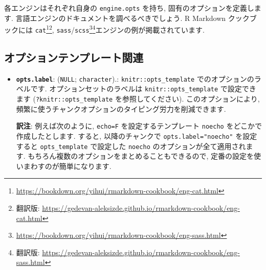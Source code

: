 \documentclass[
  11pt,
  lualatex,ja=standard,jafont=noto]{bxjsreport}
\newenvironment{Shaded}{\begin{snugshade}}{\end{snugshade}}
\newcommand{\AttributeTok}[1]{\textcolor[rgb]{0.77,0.63,0.00}{#1}}
\newcommand{\FunctionTok}[1]{\textcolor[rgb]{0.00,0.00,0.00}{#1}}
\newcommand{\NormalTok}[1]{#1}
\newcommand{\SpecialCharTok}[1]{\textcolor[rgb]{0.00,0.00,0.00}{#1}}
\newcommand{\StringTok}[1]{\textcolor[rgb]{0.31,0.60,0.02}{#1}}
\renewcommand{\href}[2]{#2\footnote{\url{#1}}}
\begin{document}
\begin{itemize}
\begin{Shaded}
\end{Shaded}

  各エンジンはそれぞれ自身の \texttt{engine.opts} を持ち, 固有のオプションを定義します. 言語エンジンのドキュメントを調べるべきでしょう. R Markdown クックブックには \href{https://bookdown.org/yihui/rmarkdown-cookbook/eng-cat.html}{\texttt{cat}}\footnote{翻訳版: \url{https://gedevan-aleksizde.github.io/rmarkdown-cookbook/eng-cat.html}}, \href{https://bookdown.org/yihui/rmarkdown-cookbook/eng-sass.html}{\texttt{sass}/\texttt{scss}}\footnote{翻訳版: \url{https://gedevan-aleksizde.github.io/rmarkdown-cookbook/eng-sass.html}}エンジンの例が掲載されています.
\end{itemize}

\hypertarget{ux30aaux30d7ux30b7ux30e7ux30f3ux30c6ux30f3ux30d7ux30ecux30fcux30c8ux95a2ux9023}{%
\subsection{オプションテンプレート関連}\label{ux30aaux30d7ux30b7ux30e7ux30f3ux30c6ux30f3ux30d7ux30ecux30fcux30c8ux95a2ux9023}}

\begin{itemize}
\item
  \textbf{\texttt{opts.label}}: (\texttt{NULL}; \texttt{character}).: \texttt{knitr::opts\_template} でのオプションのラベルです. オプションセットのラベルは \texttt{knitr::opts\_template} で設定できます (\texttt{?knitr::opts\_template} を参照してください). このオプションにより, 頻繁に使うチャンクオプションのタイピング労力を削減できます.

  \textbf{訳注}: 例えば次のように, \texttt{echo=F} を設定するテンプレート \texttt{noecho} をどこかで作成したとします. すると, 以降のチャンクで \texttt{opts.label="noecho"} を設定すると \texttt{opts\_template} で設定した \texttt{noecho} のオプションが全て適用されます. もちろん複数のオプションをまとめることもできるので, 定番の設定を使いまわすのが簡単になります.

\begin{Shaded}
\end{Shaded}
\end{itemize}
\end{document}
